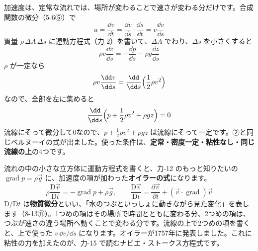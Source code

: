 加速度は、定常な流れでは、場所が変わることで速さが変わる分だけです。合成関数の微分（5-6⑤）で
\[ a=\frac{\dd v}{\dd t}=\frac{\dd v}{\dd s}\cdot\frac{\dd s}{\dd t}=v\frac{\dd v}{\dd s} \]
質量 $\rho\,\Delta A\,\Delta s$ に運動方程式（力-2）を書いて、$\Delta A$ でわり、$\Delta s$ を小さくすると
\[ \rho v\frac{\dd v}{\dd s}=-\frac{\dd p}{\dd s}-\rho g\frac{\dd z}{\dd s} \]
$\rho$ が一定なら
\[ \rho v\frac{\dd v}{\dd s}=\frac{\dd}{\dd s}\Bigl(\frac{1}{2}\rho v^2\Bigr) \]
なので、全部を左に集めると
\[ \frac{\dd}{\dd s}\Bigl(p+\frac{1}{2}\rho v^2+\rho gz\Bigr)=0 \]
流線にそって微分して0なので、$p+\tfrac{1}{2}\rho v^2+\rho gz$ は流線にそって一定です。②と同じベルヌーイの式が出ました。使った条件は、\textbf{定常・密度一定・粘性なし・同じ流線の上}の4つです。
\begin{phflow}
\end{phflow}
\begin{motto}[4]
流れの中の小さな立方体に運動方程式を書くと、力-12 のもっと知りたいの $\operatorname{grad}p=\rho\vec{g}$ に、加速度の項が加わった\textbf{オイラーの式}になります。
\[ \rho\frac{\mathrm{D}\vec{v}}{\mathrm{D}t}=-\operatorname{grad}p+\rho\vec{g},\qquad \frac{\mathrm{D}\vec{v}}{\mathrm{D}t}=\frac{\partial\vec{v}}{\partial t}+(\vec{v}\cdot\operatorname{grad})\vec{v} \]
$\mathrm{D}/\mathrm{D}t$ は\textbf{物質微分}といい、「水のつぶといっしょに動きながら見た変化」を表します（8-13⑪）。1つめの項はその場所で時間とともに変わる分、2つめの項は、つぶが速さの違う場所へ動くことで変わる分です。流線の上で2つめの項を書くと、上で使った $v\,\dd v/\dd s$ になります。オイラーが1757年に発表しました。これに粘性の力を加えたのが、力-15 で読むナビエ・ストークス方程式です。
\end{motto}

